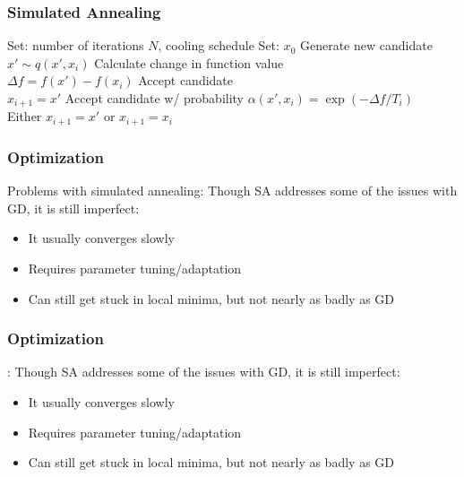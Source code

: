 \documentclass{beamer}
\begin{document}
\begin{frame}
	\frametitle{Simulated Annealing}
	
	\begin{algorithm}[H]
		\caption{Simulated Annealing}
		\begin{algorithmic}[1]
			\STATE Set: number of iterations $N$, cooling schedule 
			\STATE Set: $x_0$
				\STATE Generate new candidate \\ $x' \sim q(x',x_{i})$
				\STATE Calculate change in function value \\ $\Delta f = f(x') - f(x_i)$
					\STATE Accept candidate \\ $x_{i+1} = x'$
				\ELSE
					\STATE Accept candidate w/ probability $\alpha(x',x_i) = \exp(-\Delta f / T_i)$ \\
					Either $x_{i+1} = x'$ or $x_{i+1} = x_i$
				\ENDIF
			\ENDFOR
		\end{algorithmic}
	\end{algorithm}

\end{frame}

\begin{frame}
	\frametitle{Optimization}
	
	\begin{block}{Problems with simulated annealing:}
		Though SA addresses some of the issues with GD, it is still imperfect:
		\begin{itemize}
			\item It usually converges slowly
			\item Requires parameter tuning/adaptation
			\item Can still get stuck in local minima, but not nearly as badly as GD
		\end{itemize}
	\end{block}

\end{frame}

\begin{frame}
	\frametitle{Optimization}
	
	\begin{exampleblock}{:}
		Though SA addresses some of the issues with GD, it is still imperfect:
		\begin{itemize}
			\item It usually converges slowly
			\item Requires parameter tuning/adaptation
			\item Can still get stuck in local minima, but not nearly as badly as GD
		\end{itemize}
	\end{exampleblock}

\end{frame}
\end{document}
